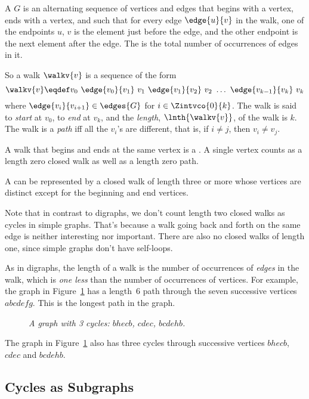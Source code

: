\begin{definition}\label{def:simplegraph-walks}
A  $G$ is an alternating sequence of
vertices and edges that begins with a vertex, ends with a vertex, and
such that for every edge $\edge{u}{v}$ in the walk, one of the
endpoints $u$, $v$ is the element just before the edge, and the other
endpoint is the next element after the edge.  The  is the total number of occurrences of edges in it.

So a walk $\walkv{v}$ is a sequence of the form
\[
\walkv{v} \eqdef v_0\ \edge{v_0}{v_1}\
v_1\  \edge{v_1}{v_2}\  v_2\  \dots\  \edge{v_{k-1}}{v_k}\  v_k
\]
where $\edge{v_i}{v_{i+1}} \in \edges{G}$ for $i \in \Zintvco{0}{k}$.
  The walk is said to \emph{start} at $v_0$, to \emph{end} at $v_k$,
  and the \emph{length}, $\lnth{\walkv{v}}$, of the walk is
  $k$.  The walk is a \emph{path} iff all the $v_i$'s are different,
  that is, if $i \neq j$, then $v_i \neq v_j$.

A walk that begins and ends at the same vertex is a \term{closed
  walk}.  A single vertex counts as a length zero closed walk as well
as a length zero path.

A  can be represented by a closed walk of length three or
more whose vertices are distinct except for the beginning and end
vertices.
\end{definition}
Note that in contrast to digraphs, we don't count length two closed
walks as cycles in simple graphs.  That's because a walk going back
and forth on the same edge is neither interesting nor important.
There are also no closed walks of length one, since simple graphs
don't have self-loops.

As in digraphs, the length of a walk is the number of occurrences of
\emph{edges} in the walk, which is \emph{one less} than the number of
occurrences of vertices.  For example, the graph in
Figure~\ref{dg} has a length~6 path through the seven successive
vertices $abcdefg$.  This is the longest path in the graph.
\begin{figure}
\caption{\em A graph with 3 cycles: $bhecb$,
$cdec$, $bcdehb$.}
\label{dg}
\end{figure}
The graph in Figure~\ref{dg} also has three cycles through successive
vertices $bhecb$, $cdec$ and $bcdehb$.

\subsection{Cycles as Subgraphs}

